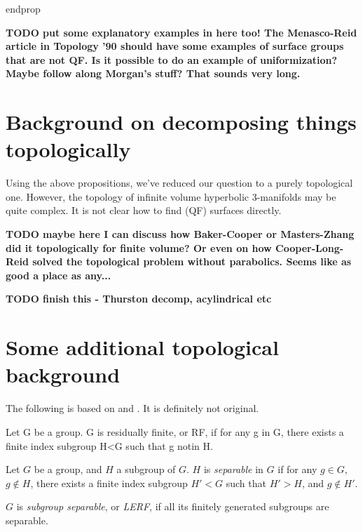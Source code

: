 endprop

\textbf{ TODO put some explanatory examples in here too! The Menasco-Reid
article in Topology '90 should have some examples of surface groups that are
not QF. Is it possible to do an example of uniformization? Maybe follow along
Morgan's stuff? That sounds very long. }

\section{Background on decomposing things topologically}

Using the above propositions, we've reduced our question to a purely
topological one. However, the topology of infinite volume hyperbolic
3-manifolds may be quite complex. It is not clear how to find (QF) surfaces
directly.

\textbf{ TODO maybe here I can discuss how Baker-Cooper or Masters-Zhang did it
topologically for finite volume? Or even on how Cooper-Long-Reid solved the
topological problem without parabolics. Seems like as good a place as any...}


\textbf{TODO finish this - Thurston decomp, acylindrical etc}

\section{Some additional topological background}

The following is based on \cite{AFW} and \cite{LR}. It is definitely not
original.

\begin{defn}

Let G be a group. G is residually finite, or RF, if for any g in G, there
exists a finite index subgroup H<G such that g notin H.

Let $G$ be a group, and $H$ a subgroup of $G$. $H$ is \emph{separable} in $G$
if for any $g \in G$, $g \notin H$, there exists a finite index subgroup $H'<G$
such that $H'>H$, and $g \notin H'$.

$G$ is \emph{subgroup separable}, or \emph{LERF}, if all its finitely generated
subgroups are separable.

\end{defn}

